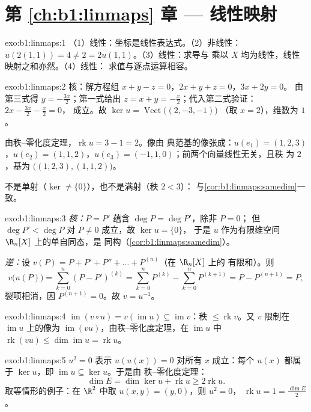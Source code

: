 \section*{第 \ref{ch:b1:linmaps} 章 --- 线性映射}

\begin{solution}{exo:b1:linmaps:1}
（1）线性：坐标是线性表达式。（2）非线性：
$u(2(1,1)) = 4 \neq 2 = 2u(1,1)$。（3）线性：求导与
乘以 $X$ 均为线性，线性映射之和亦然。（4）线性：
求值与逐点运算相容。
\end{solution}

\begin{solution}{exo:b1:linmaps:2}
核：解方程组 $x + y - z = 0$，$2x + y + z = 0$，$3x + 2y = 0$。
由第三式得 $y = -\frac{3x}{2}$；第一式给出 $z = x + y =
-\frac x2$；代入第二式验证：$2x - \frac{3x}{2} - \frac x2 = 0$，
成立。故 $\ker u = \operatorname{Vect}\bigl((2, -3, -1)\bigr)$
（取 $x = 2$），维数为 $1$。

由秩–零化度定理，$\operatorname{rk} u = 3 - 1 = 2$。像由
典范基的像张成：$u(e_1) = (1,2,3)$，$u(e_2) =
(1,1,2)$，$u(e_3) = (-1,1,0)$；前两个向量线性无关，且秩
为 $2$，基为 $\bigl((1,2,3), (1,1,2)\bigr)$。

不是单射（$\ker \neq \{0\}$），也不是满射（秩 $2 < 3$）：
与\cref{cor:b1:linmaps:samedim}一致。
\end{solution}

\begin{solution}{exo:b1:linmaps:3}
\emph{核：}$P = P'$ 蕴含 $\deg P = \deg P'$，除非 $P = 0$；
但 $\deg P' < \deg P$ 对 $P \neq 0$ 成立，故 $\ker u = \{0\}$，
于是 $u$ 作为有限维空间 $\R_n[X]$ 上的单自同态，是
同构（\cref{cor:b1:linmaps:samedim}）。

\emph{逆：}设 $v(P) = P + P' + P'' + \dots + P^{(n)}$（在 $\R_n[X]$ 上的
有限和）。则
\[
v\bigl(u(P)\bigr) = \sum_{k=0}^{n} (P - P')^{(k)}
= \sum_{k=0}^{n} P^{(k)} - \sum_{k=0}^{n} P^{(k+1)}
= P - P^{(n+1)} = P ,
\]
裂项相消，因 $P^{(n+1)} = 0$。故 $v = u^{-1}$。
\end{solution}

\begin{solution}{exo:b1:linmaps:4}
$\operatorname{im}(v \circ u) = v(\operatorname{im} u) \subseteq
\operatorname{im} v$：秩 $\leq \operatorname{rk} v$。又 $v$
限制在 $\operatorname{im} u$ 上的像为
$\operatorname{im}(vu)$，由秩–零化度定理，在
$\operatorname{im} u$ 中 $\operatorname{rk}(vu) \leq
\dim\operatorname{im} u = \operatorname{rk} u$。
\end{solution}

\begin{solution}{exo:b1:linmaps:5}
$u^2 = 0$ 表示 $u(u(x)) = 0$ 对所有 $x$ 成立：每个 $u(x)$ 都属于
$\ker u$，即 $\operatorname{im} u \subseteq \ker u$。于是由
秩–零化度定理：
\[
\dim E = \dim\ker u + \operatorname{rk} u \geq 2\operatorname{rk} u .
\]
取等情形的例子：在 $\R^2$ 中取 $u(x, y) = (y, 0)$，则 $u^2 = 0$，
$\operatorname{rk} u = 1 = \frac{\dim E}{2}$。
\end{solution}

